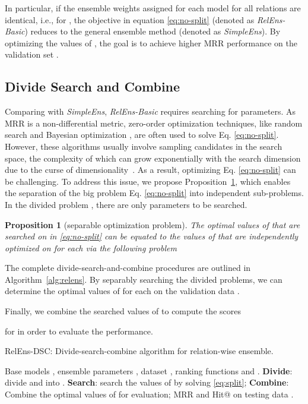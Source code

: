\documentclass[11pt,a4paper]{article}
\newtheorem{prop}{Proposition}
\begin{document}
  
  In particular,
  if the ensemble weights assigned for each model  for all relations are identical,
  i.e.,
   for ,
  the objective in equation \eqref{eq:no-split} (denoted as \textit{RelEns-Basic})
  reduces to the general ensemble method (denoted as \textit{SimpleEns}).
  By optimizing the values of , the goal is to achieve higher MRR 
performance on the validation set 
  .
  
  
  \subsection{Divide Search and Combine}
  
  Comparing with \textit{SimpleEns},
  \textit{RelEns-Basic}
  requires searching for  parameters.
  As MRR is a non-differential metric,
  zero-order optimization techniques,
  like random search and Bayesian optimization \cite{bergstra2011algorithms},
  are often used to solve Eq. \eqref{eq:no-split}.
  However,
  these algorithms usually involve sampling
  candidates in the search space,
  the complexity of which can grow exponentially with the
  search dimension due to the curse of dimensionality~\cite{koppen2000curse}.
  As a result,
  optimizing
  Eq. \eqref{eq:no-split} can be challenging.
  To address this issue,
  we propose Proposition~\ref{prop:sepa}, 
  which enables the separation of 
  the big problem Eq. \eqref{eq:no-split}
  into  independent sub-problems.
  In the  divided problem ,
  there are only  parameters 
  to be searched.
  
  
  \begin{prop}[separable optimization problem]
    \label{prop:sepa}
    The optimal values of  that are searched on  in \eqref{eq:no-split}
    can be equated to the values of  
    that are independently optimized on
     for each 
    via the following problem
    
  \end{prop}
  
  
  The complete divide-search-and-combine procedures 
  are outlined in Algorithm~\ref{alg:relens}.
  By separably searching the divided problems,
  we can determine the optimal values of 
   for each  on the validation data .
  
  Finally, we combine the searched values of {}
  to compute the scores
  
  for  in order to evaluate the performance.
  
  
  \begin{algorithm}[ht]
    \caption{RelEns-DSC: Divide-search-combine algorithm for relation-wise ensemble.}
    \label{alg:relens}
\begin{algorithmic}[1]
      \REQUIRE
      Base models ,
      ensemble parameters ,
      dataset ,
      ranking functions  and .
      \STATE \textbf{Divide}:
      divide   and  into
      .
        \STATE \textbf{Search}:
        \STATE search the values of  by solving  \eqref{eq:split};
        \ENDFOR
        \STATE  \textbf{Combine}:
        Combine the optimal values of 
        for evaluation;
        \RETURN MRR and Hit@ on testing data .
    \end{algorithmic}
  \end{algorithm}
  
\end{document}
